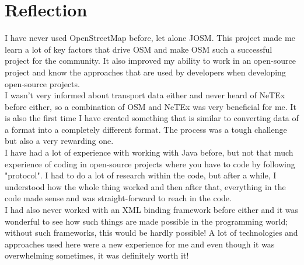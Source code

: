 \section{Reflection}
I have never used OpenStreetMap before, let alone JOSM. This project made me learn a lot of key factors that drive OSM and make OSM such a successful project for the community. It also improved my ability to work in an open-source project and know the approaches that are used by developers when developing open-source projects.\\
\newline
I wasn't very informed about transport data either and never heard of NeTEx before either, so a combination of OSM and NeTEx was very beneficial for me. It is also the first time I have created something that is similar to converting data of a format into a completely different format. The process was a tough challenge but also a very rewarding one.\\
\newline
I have had a lot of experience with working with Java before, but not that much experience of coding in open-source projects where you have to code by following "protocol". I had to do a lot of research within the code, but after a while, I understood how the whole thing worked and then after that, everything in the code made sense and was straight-forward to reach in the code.\\
\newline
I had also never worked with an XML binding framework before either and it was wonderful to see how such things are made possible in the programming world; without such frameworks, this would be hardly possible! A lot of technologies and approaches used here were a new experience for me and even though it was overwhelming sometimes, it was definitely worth it!